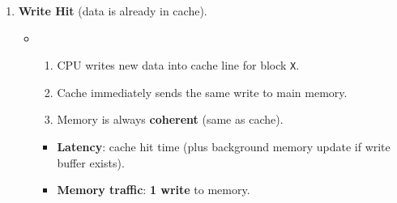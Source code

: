 \begin{enumerate}
    \item \textbf{Write Hit} (data is already in cache).
    \begin{itemize}
        \item {}
        \begin{enumerate}
            \item CPU writes new data into cache line for block \texttt{X}.
            \item Cache immediately sends the same write to main memory.
            \item Memory is always \textbf{coherent} (same as cache).
        \end{enumerate}
        \begin{itemize}
            \item[\textcolor{Green3}{\faIcon{clock}}] \textcolor{Green3}{\textbf{Latency}}: cache hit time (plus background memory update if write buffer exists).
            \item[\textcolor{Green3}{\faIcon{traffic-light}}] \textcolor{Green3}{\textbf{Memory traffic}}: \textbf{1 write} to memory.
        \end{itemize}


\end{itemize}
\end{enumerate}
